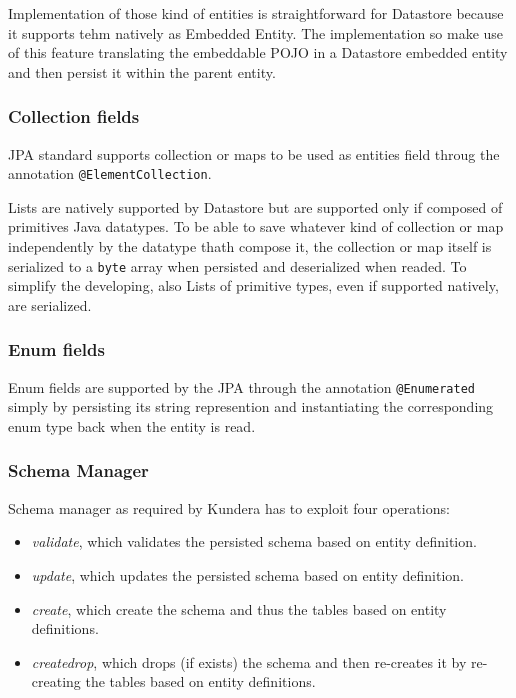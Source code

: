 \newparagraph Implementation of those kind of entities is straightforward for Datastore because it supports tehm natively as Embedded Entity.
\noindent The implementation so make use of this feature translating the embeddable POJO in a Datastore embedded entity and then persist it within the parent entity.

\subsubsection{Collection fields}
JPA standard supports collection or maps to be used as entities field throug the annotation \texttt{@ElementCollection}.

\newparagraph Lists are natively supported by Datastore but are supported only if composed of primitives Java datatypes.
\noindent To be able to save whatever kind of collection or map independently by the datatype thath compose it, the collection or map itself is serialized to a \texttt{byte} array when persisted and deserialized when readed.
\noindent To simplify the developing, also Lists of primitive types, even if supported natively, are serialized.

\subsubsection{Enum fields}
Enum fields are supported by the JPA through the annotation \texttt{@Enumerated}  simply by persisting its string represention and instantiating the corresponding enum type back when the entity is read.

\subsubsection{Schema Manager}
Schema manager as required by Kundera has to exploit four operations:
\begin{itemize}
\item \textit{validate}, which validates the persisted schema based on entity definition.
\item \textit{update}, which updates the persisted schema based on entity definition.
\item \textit{create}, which create the schema and thus the tables based on entity definitions.
\item \textit{create\textunderscore drop}, which drops (if exists) the schema and then re-creates it by re-creating the tables based on entity definitions.
\end{itemize}

